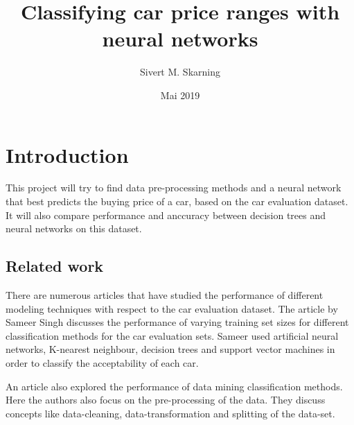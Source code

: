 \documentclass[a4paper, 12pt]{article}
\title{Classifying car price ranges with neural networks}
\author{Sivert M. Skarning}
\date{Mai 2019}
\begin{document}
\maketitle
\clearpage
\tableofcontents
\clearpage

\section{Introduction}
This project will try to find data pre-processing methods and a neural network that best predicts the buying price of a car, based on the car evaluation dataset.
It will also compare performance and anccuracy between decision trees and neural networks on this dataset.
\subsection{Related work}
There are numerous articles that have studied the performance of different modeling techniques with respect to the car evaluation dataset. The article by Sameer Singh\cite{singh2005modeling} discusses the performance of varying training set sizes for different classification methods for the car evaluation sets. Sameer used artificial neural networks, K-nearest neighbour, decision trees and support vector machines in order to classify the acceptability of each car.


An article\cite{perf} also explored the performance of data mining classification methods. Here the authors also focus on the pre-processing of the data. They discuss concepts like data-cleaning, data-transformation and splitting of the data-set.

\clearpage


\end{document}
